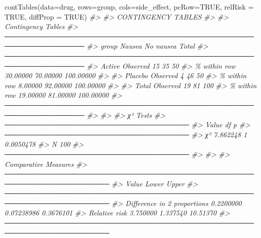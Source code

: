 \documentclass[
]{memoir}
\newenvironment{Shaded}{\begin{snugshade}}{\end{snugshade}}
\newcommand{\AttributeTok}[1]{\textcolor[rgb]{0.77,0.63,0.00}{#1}}
\newcommand{\CommentTok}[1]{\textcolor[rgb]{0.56,0.35,0.01}{\textit{#1}}}
\newcommand{\ConstantTok}[1]{\textcolor[rgb]{0.00,0.00,0.00}{#1}}
\newcommand{\FunctionTok}[1]{\textcolor[rgb]{0.00,0.00,0.00}{#1}}
\newcommand{\NormalTok}[1]{#1}
\begin{document}
\begin{Shaded}
\begin{Highlighting}[]
\FunctionTok{contTables}\NormalTok{(}\AttributeTok{data=}\NormalTok{drug, }\AttributeTok{rows=}\NormalTok{group, }\AttributeTok{cols=}\NormalTok{side\_effect, }\AttributeTok{pcRow=}\ConstantTok{TRUE}\NormalTok{, }\AttributeTok{relRisk =} \ConstantTok{TRUE}\NormalTok{, }\AttributeTok{diffProp =} \ConstantTok{TRUE}\NormalTok{)}
\CommentTok{\#\textgreater{} }
\CommentTok{\#\textgreater{}  CONTINGENCY TABLES}
\CommentTok{\#\textgreater{} }
\CommentTok{\#\textgreater{}  Contingency Tables                                                 }
\CommentTok{\#\textgreater{}  ────────────────────────────────────────────────────────────────── }
\CommentTok{\#\textgreater{}    group                      Nausea       No nausea    Total       }
\CommentTok{\#\textgreater{}  ────────────────────────────────────────────────────────────────── }
\CommentTok{\#\textgreater{}    Active     Observed               15           35           50   }
\CommentTok{\#\textgreater{}               \% within row     30.00000     70.00000    100.00000   }
\CommentTok{\#\textgreater{}                                                                     }
\CommentTok{\#\textgreater{}    Placebo    Observed                4           46           50   }
\CommentTok{\#\textgreater{}               \% within row      8.00000     92.00000    100.00000   }
\CommentTok{\#\textgreater{}                                                                     }
\CommentTok{\#\textgreater{}    Total      Observed               19           81          100   }
\CommentTok{\#\textgreater{}               \% within row     19.00000     81.00000    100.00000   }
\CommentTok{\#\textgreater{}  ────────────────────────────────────────────────────────────────── }
\CommentTok{\#\textgreater{} }
\CommentTok{\#\textgreater{} }
\CommentTok{\#\textgreater{}  χ² Tests                              }
\CommentTok{\#\textgreater{}  ───────────────────────────────────── }
\CommentTok{\#\textgreater{}          Value       df    p           }
\CommentTok{\#\textgreater{}  ───────────────────────────────────── }
\CommentTok{\#\textgreater{}    χ²    7.862248     1    0.0050478   }
\CommentTok{\#\textgreater{}    N          100                      }
\CommentTok{\#\textgreater{}  ───────────────────────────────────── }
\CommentTok{\#\textgreater{} }
\CommentTok{\#\textgreater{} }
\CommentTok{\#\textgreater{}  Comparative Measures                                                    }
\CommentTok{\#\textgreater{}  ─────────────────────────────────────────────────────────────────────── }
\CommentTok{\#\textgreater{}                                   Value        Lower         Upper       }
\CommentTok{\#\textgreater{}  ─────────────────────────────────────────────────────────────────────── }
\CommentTok{\#\textgreater{}    Difference in 2 proportions    0.2200000    0.07238986    0.3676101   }
\CommentTok{\#\textgreater{}    Relative risk                   3.750000      1.337540     10.51370   }
\CommentTok{\#\textgreater{}  ───────────────────────────────────────────────────────────────────────}
\end{Highlighting}
\end{Shaded}
\end{document}

